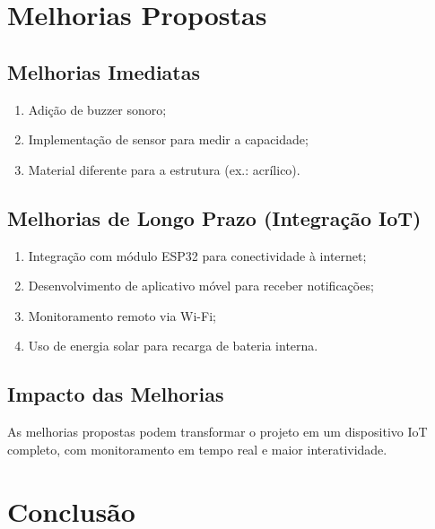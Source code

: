 \documentclass[12pt, openany, oneside, a4paper, brazilian]{abntex2}
\begin{document}

\chapter{Melhorias Propostas}

\section{Melhorias Imediatas}

\begin{enumerate}
    \item Adição de buzzer sonoro;
    \item Implementação de sensor para medir a capacidade;
    \item Material diferente para a estrutura (ex.: acrílico).
\end{enumerate}

\section{Melhorias de Longo Prazo (Integração IoT)}

\begin{enumerate}
    \item Integração com módulo ESP32 para conectividade à internet;
    \item Desenvolvimento de aplicativo móvel para receber notificações;
    \item Monitoramento remoto via Wi-Fi;
    \item Uso de energia solar para recarga de bateria interna.
\end{enumerate}

\section{Impacto das Melhorias}

As melhorias propostas podem transformar o projeto em um
dispositivo IoT completo, com monitoramento em tempo real e maior
interatividade.


\chapter{Conclusão}
\end{document}
